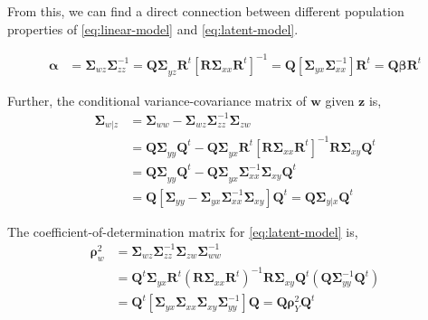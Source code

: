 \documentclass[3p,times,12pt,authoryear]{elsarticle}
\providecommand{\tightlist}{%
  \setlength{\itemsep}{0pt}\setlength{\parskip}{0pt}}
\theoremstyle{definition}
\theoremstyle{definition}
\theoremstyle{remark}
\begin{document}
From this, we can find a direct connection between different population
properties of \eqref{eq:linear-model} and \eqref{eq:latent-model}.

\begin{description}
\tightlist
\item[Regression Coefficients]
\[
  \begin{aligned}
  \boldsymbol{\alpha} &= \boldsymbol{\Sigma}_{wz} \boldsymbol{\Sigma}_{zz}^{-1}
  = \boldsymbol{Q\Sigma}_{yz}\mathbf{R}^t\left[\boldsymbol{R\Sigma}_{xx}\mathbf{R}^t\right]^{-1}
  = \mathbf{Q}\left[\boldsymbol{\Sigma}_{yx}\boldsymbol{\Sigma}_{xx}^{-1}\right]\mathbf{R}^t
  = \mathbf{Q}\boldsymbol{\beta}\mathbf{R}^t
  \end{aligned}
  \]
\item[Conditional Variance]
Further, the conditional variance-covariance matrix of \(\mathbf{w}\)
given \(\mathbf{z}\) is, \[
  \begin{aligned}
\boldsymbol{\Sigma}_{w|z}
&= \boldsymbol{\Sigma}_{ww} - \boldsymbol{\Sigma}_{wz}\boldsymbol{\Sigma}_{zz}^{-1}\boldsymbol{\Sigma}_{zw} \\
&= \boldsymbol{Q\Sigma}_{yy}\mathbf{Q}^t -
  \boldsymbol{Q \Sigma}_{yx}\mathbf{R}^t \left[\boldsymbol{R\Sigma}_{xx}\boldsymbol{R}^t\right]^{-1}
  \boldsymbol{R\Sigma}_{xy}\mathbf{Q}^t \nonumber \\
&= \boldsymbol{Q\Sigma}_{yy}\mathbf{Q}^t - 
  \boldsymbol{Q \Sigma}_{yx}\boldsymbol{\Sigma}_{xx}^{-1}\boldsymbol{\Sigma}_{xy}\mathbf{Q}^t \\
&= \mathbf{Q}\left[\boldsymbol{\Sigma}_{yy} -
  \boldsymbol{\Sigma}_{yx}\boldsymbol{\Sigma}_{xx}^{-1}\boldsymbol{\Sigma}_{xy}\right]\mathbf{Q}^{t}
= \mathbf{Q} \boldsymbol{\Sigma}_{y|x}\mathbf{Q}^t
  \end{aligned}
  \]
\item[Coefficient of Determination]
The coefficient-of-determination matrix for \eqref{eq:latent-model} is, \[
  \begin{aligned}
\boldsymbol{\rho}^2_w &= \boldsymbol{\Sigma}_{wz} 
\boldsymbol{\Sigma}_{zz}^{-1} \boldsymbol{\Sigma}_{zw} 
\boldsymbol{\Sigma}_{ww}^{-1} \\
  &=\mathbf{Q}^t
  \boldsymbol{\Sigma}_{yx}\mathbf{R}^t \left(\mathbf{R}\boldsymbol{\Sigma}_{xx}\mathbf{R}^t\right)^{-1}
  \mathbf{R}\boldsymbol{\Sigma}_{xy}\mathbf{Q}^t \left(\mathbf{Q} \boldsymbol{\Sigma}_{yy}^{-1} \mathbf{Q}^t\right) \nonumber \\
  &=\mathbf{Q}^t\left[\boldsymbol{\Sigma}_{yx}\boldsymbol{\Sigma}_{xx}\boldsymbol{\Sigma}_{xy}\boldsymbol{\Sigma}_{yy}^{-1}\right]\mathbf{Q}
  = \mathbf{Q}\boldsymbol{\rho}_{Y}^2 \mathbf{Q}^t
  \end{aligned}
  \]
\end{description}
\end{document}
